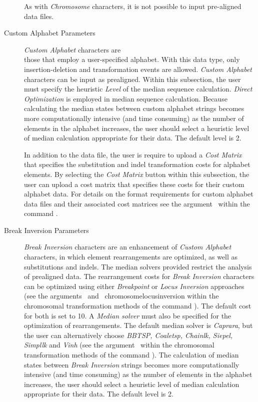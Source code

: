 \begin{description}
		As with \emph{Chromosome} characters, it is not possible to input pre-aligned data files. 
		
	\item [Custom Alphabet Parameters] \emph{Custom Alphabet} characters are \\those that employ
		a user-specified alphabet. With this data type, only insertion-deletion and transformation
		events are allowed. \emph{Custom Alphabet} characters can be input as prealigned. Within this 
		subsection, the user must specify the heuristic \emph{Level} of the median sequence calculation.
		\emph{Direct Optimization} is employed in median sequence calculation. Because calculating 
		the median states between custom alphabet strings becomes more computationally intensive (and time 
		consuming) as the number of elements in the alphabet increases, the user should select a heuristic 
		level of median calculation appropriate for their data.  The default level is 2.
		
		\indent In addition to the data file, the user is require to upload a \emph {Cost Matrix} that specifies 
		the substitution and indel transformation costs for alphabet elements.  By selecting the 
		\emph {Cost Matrix} button within this subsection, the user can upload a cost matrix that 
		specifies these costs for their custom alphabet data. For details on the format requirements for 
		custom alphabet data files and their associated cost matrices see the 
		argument~ within the command 	.

	\item [Break Inversion Parameters] \emph{Break Inversion} characters are an enhancement of 				
		\emph{Custom 	Alphabet} characters, in which element rearrangements are optimized, as well as
		 substitutions and indels. The median solvers provided restrict the analysis of prealigned data. 
		 The rearrangement costs for \emph{Break Inversion} characters can be optimized using 
		 either \emph{Breakpoint} or \emph{Locus Inversion} approaches (see the 
		 arguments~ and~
		 {chromosomelocusinversion} within the chromosomal transformation methods of the command 
		 ). The default cost for both is set to 10. A \emph{Median solver} must also be 
		 specified for the optimization of rearrangements. The default median solver is \emph{Caprara}, 
		 but the user can alternatively choose \emph{BBTSP, Coaletsp, Chainlk, Siepel, Simpllk} and 
		 \emph{Vinh} (see the argument~ within the 
		 chromosomal transformation methods of the command ).  
		 The calculation of median states between 
		 \emph {Break Inversion} strings becomes more computationally intensive (and time consuming) 
		 as the number of elements in the alphabet increases, the user should select a heuristic level 
		 of median calculation appropriate for their data.  The default level is 2.
		 


\end{description}
